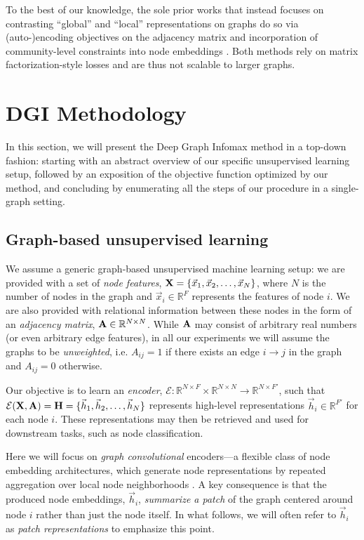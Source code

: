 \documentclass{article} \usepackage{iclr2019_conference,times}
\begin{document}
To the best of our knowledge, the sole prior works that instead focuses on contrasting ``global'' and ``local'' representations on graphs do so via (auto-)encoding objectives on the adjacency matrix \citep{wang2016structural} and incorporation of community-level constraints into node embeddings \citep{wang2017community}. Both methods rely on matrix factorization-style losses and are thus not scalable to larger graphs. 

\section{DGI Methodology}

In this section, we will present the Deep Graph Infomax method in a top-down fashion: starting with an abstract overview of our specific unsupervised learning setup, followed by an exposition of the objective function optimized by our method, and concluding by enumerating all the steps of our procedure in a single-graph setting. 

\subsection{Graph-based unsupervised learning}

We assume a generic graph-based unsupervised machine learning setup: we are provided with a set of \emph{node features}, ${\bf X} = \{\vec{x}_1, \vec{x}_2, \dots, \vec{x}_N\}$, where $N$ is the number of nodes in the graph and $\vec{x}_i \in \mathbb{R}^F$ represents the features of node $i$. We are also provided with relational information between these nodes in the form of an \emph{adjacency matrix}, ${\bf A} \in \mathbb{R}^{N\times N}$. While ${\bf A}$ may consist of arbitrary real numbers (or even arbitrary edge features), in all our experiments we will assume the graphs to be \emph{unweighted}, i.e. $A_{ij} = 1$ if there exists an edge $i\rightarrow j$ in the graph and $A_{ij} = 0$ otherwise.

Our objective is to learn an \emph{encoder}, $\mathcal{E} : \mathbb{R}^{N \times F} \times \mathbb{R}^{N \times N} \rightarrow \mathbb{R}^{N \times F'}$, such that $\mathcal{E}({\bf X}, {\bf A}) = {\bf H} = \{\vec{h}_1, \vec{h}_2, \dots, \vec{h}_N\}$ represents high-level representations $\vec{h}_i \in \mathbb{R}^{F'}$ for each node $i$. These representations may then be retrieved and used for downstream tasks, such as node classification.

Here we will focus on \emph{graph convolutional} encoders---a flexible class of node embedding architectures, which generate node representations by repeated aggregation over local node neighborhoods \citep{gilmer2017neural}.
A key consequence is that the produced node embeddings, $\vec{h}_i$, \emph{summarize a patch} of the graph centered around node $i$ rather than just the node itself. In what follows, we will often refer to $\vec{h}_i$ as {\em patch representations} to emphasize this point.
\end{document}
